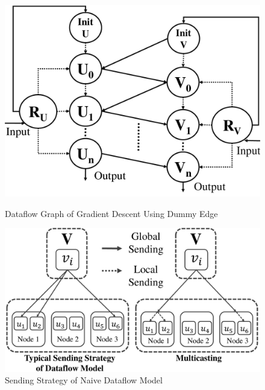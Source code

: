 \documentclass{llncs}
\begin{document}
\begin{figure}[h]
\begin{minipage}[t]{0.45\linewidth}
\centering
\includegraphics[width=\textwidth]{pics/DDCF.pdf}
\caption{Dataflow Graph of Gradient Descent Using Dummy Edge \label{fig:DDCF}}
\end{minipage}
\hfill
\begin{minipage}[t]{0.5\linewidth}
\centering
\includegraphics[width=\textwidth]{pics/multicasting.pdf}
\caption{Sending Strategy of Naive Dataflow Model \label{fig:multicasting}}
\end{minipage}
\vspace{-20pt}
\end{figure}

\vspace{-15pt}
\end{document}
